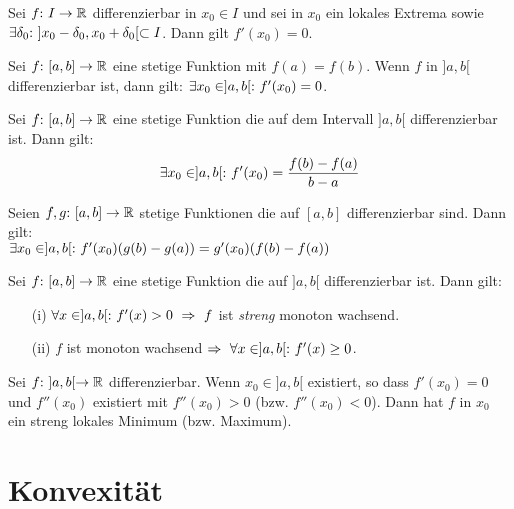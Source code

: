 \begin{framedthm}
	Sei $f{:}\  I \to \mathbb{R}$ differenzierbar in $x_0 \in I$ und sei in $x_0$ ein lokales Extrema sowie $\exists \delta_0 {:}\  ]x_0 - \delta_0, x_0 + \delta_0[ \subset I$. Dann gilt $f'(x_0) = 0$.
\end{framedthm}

\begin{framedthm}
	Sei $f{:}\  [a,b] \to \mathbb{R}$ eine stetige Funktion mit $f(a)=f(b)$. Wenn $f$ in $]a,b[$ differenzierbar ist, dann gilt: $\exists x_0 \in ]a,b[{:}\  f'(x_0) = 0$.
\end{framedthm}

\begin{framedthm}
	Sei $f{:}\  [a,b] \to \mathbb{R}$ eine stetige Funktion die auf dem Intervall $]a,b[$ differenzierbar ist. Dann gilt: \[
	\exists x_0 \in ]a,b[{:}\  f'(x_0) = \frac{f(b) - f(a)}{b-a}
	\]
\end{framedthm}

\begin{framedthm}
	Seien $f,g{:}\  [a,b] \to \mathbb{R}$ stetige Funktionen die auf $[a,b]$ differenzierbar sind. Dann gilt:\\
	$\exists x_0 \in ]a,b[{:}\  f'(x_0) (g(b)-g(a)) = g'(x_0) (f(b)-f(a))$
\end{framedthm}

\begin{framedthm}
	Sei $f{:}\  [a,b] \to \mathbb{R}$ eine stetige Funktion die auf $]a,b[$ differenzierbar ist. Dann gilt:
	\begin{enumerate}
		\item [(i)] $\forall x \in ]a,b[\st f'(x) > 0 \ \Rightarrow \ f$ ist \textit{streng} monoton wachsend. 
		\item [(ii)] $f$ ist monoton wachsend $\Rightarrow \ \forall x \in ]a,b[ {:}\  f'(x) \geq 0$.
	\end{enumerate}
\end{framedthm}

\begin{framedthm}
	Sei $f{:}\ ]a,b[ \to \mathbb{R}$ differenzierbar. Wenn $x_0 \in ]a,b[$ existiert, so dass $f'(x_0) = 0$ und $f''(x_0)$ existiert mit $f''(x_0) > 0$ (bzw. $f''(x_0) < 0$). Dann hat $f$ in $x_0$ ein streng lokales Minimum (bzw. Maximum).
\end{framedthm}

\section{Konvexität}

